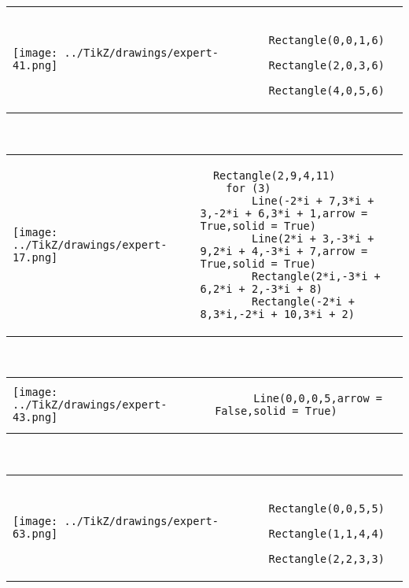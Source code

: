 
        \begin{tabular}{ll}
\texttt{[image: ../TikZ/drawings/expert-41.png]}&
        \begin{minipage}{10cm}
        \begin{verbatim}
  Rectangle(0,0,1,6)
  Rectangle(2,0,3,6)
  Rectangle(4,0,5,6)
        \end{verbatim}
\end{minipage}
\end{tabular}        
        \\

        \begin{tabular}{ll}
\texttt{[image: ../TikZ/drawings/expert-17.png]}&
        \begin{minipage}{10cm}
        \begin{verbatim}
  Rectangle(2,9,4,11)
    for (3)
        Line(-2*i + 7,3*i + 3,-2*i + 6,3*i + 1,arrow = True,solid = True)
        Line(2*i + 3,-3*i + 9,2*i + 4,-3*i + 7,arrow = True,solid = True)
        Rectangle(2*i,-3*i + 6,2*i + 2,-3*i + 8)
        Rectangle(-2*i + 8,3*i,-2*i + 10,3*i + 2)
        \end{verbatim}
\end{minipage}
\end{tabular}        
        \\

        \begin{tabular}{ll}
\texttt{[image: ../TikZ/drawings/expert-43.png]}&
        \begin{minipage}{10cm}
        \begin{verbatim}
      Line(0,0,0,5,arrow = False,solid = True)
        \end{verbatim}
\end{minipage}
\end{tabular}        
        \\

        \begin{tabular}{ll}
\texttt{[image: ../TikZ/drawings/expert-63.png]}&
        \begin{minipage}{10cm}
        \begin{verbatim}
  Rectangle(0,0,5,5)
  Rectangle(1,1,4,4)
  Rectangle(2,2,3,3)
        \end{verbatim}
\end{minipage}
\end{tabular}        
        \\

